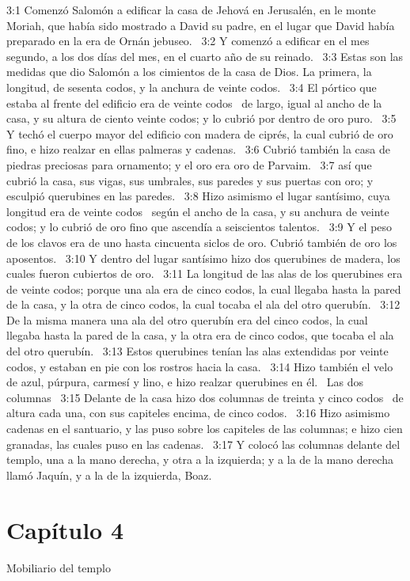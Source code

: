			3:1 Comenzó Salomón a edificar la casa de Jehová en Jerusalén, en le monte Moriah, que había sido mostrado a David su padre, en el lugar que David había preparado en la era de Ornán jebuseo.  
			3:2 Y comenzó a edificar en el mes segundo, a los dos días del mes, en el cuarto año de su reinado.  
			3:3 Estas son las medidas que dio Salomón a los cimientos de la casa de Dios. La primera, la longitud, de sesenta codos, y la anchura de veinte codos.  
			3:4 El pórtico que estaba al frente del edificio era de veinte codos  de largo, igual al ancho de la casa, y su altura de ciento veinte codos; y lo cubrió por dentro de oro puro.  
			3:5 Y techó el cuerpo mayor del edificio con madera de ciprés, la cual cubrió de oro fino, e hizo realzar en ellas palmeras y cadenas.  
			3:6 Cubrió también la casa de piedras preciosas para ornamento; y el oro era oro de Parvaim.  
			3:7 así que cubrió la casa, sus vigas, sus umbrales, sus paredes y sus puertas con oro; y esculpió querubines en las paredes.  
			3:8 Hizo asimismo el lugar santísimo, cuya longitud era de veinte codos  según el ancho de la casa, y su anchura de veinte codos; y lo cubrió de oro fino que ascendía a seiscientos talentos.  
			3:9 Y el peso de los clavos era de uno hasta cincuenta siclos de oro. Cubrió también de oro los aposentos.  
			3:10 Y dentro del lugar santísimo hizo dos querubines de madera, los cuales fueron cubiertos de oro.  
			3:11 La longitud de las alas de los querubines era de veinte codos; porque una ala era de cinco codos, la cual llegaba hasta la pared de la casa, y la otra de cinco codos, la cual tocaba el ala del otro querubín.  
			3:12 De la misma manera una ala del otro querubín era del cinco codos, la cual llegaba hasta la pared de la casa, y la otra era de cinco codos, que tocaba el ala del otro querubín.  
			3:13 Estos querubines tenían las alas extendidas por veinte codos, y estaban en pie con los rostros hacia la casa.  
			3:14 Hizo también el velo de azul, púrpura, carmesí y lino, e hizo realzar querubines en él.  
			Las dos columnas   
			3:15 Delante de la casa hizo dos columnas de treinta y cinco codos  de altura cada una, con sus capiteles encima, de cinco codos.  
			3:16 Hizo asimismo cadenas en el santuario, y las puso sobre los capiteles de las columnas; e hizo cien granadas, las cuales puso en las cadenas.  
			3:17 Y colocó las columnas delante del templo, una a la mano derecha, y otra a la izquierda; y a la de la mano derecha llamó Jaquín, y a la de la izquierda, Boaz.  
			\section*{Capítulo 4}
				Mobiliario del templo   
				
